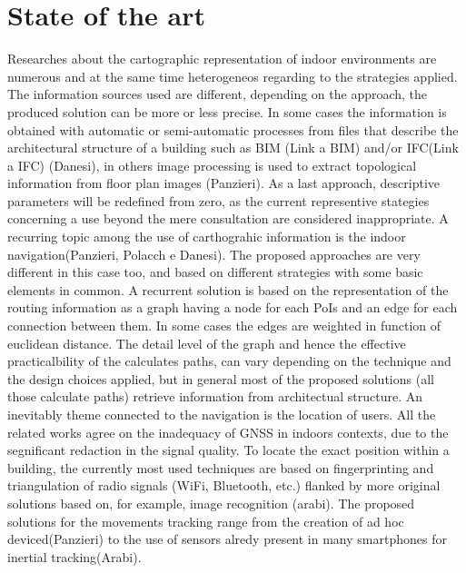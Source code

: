 \documentclass{sig-alternate}
\begin{document}
\section{State of the art}\label{state-of-the-art}

Researches about the cartographic representation of indoor environments
are numerous and at the same time heterogeneos regarding to the
strategies applied. The information sources used are different,
depending on the approach, the produced solution can be more or less
precise. In some cases the information is obtained with automatic or
semi-automatic processes from files that describe the architectural
structure of a building such as BIM (Link a BIM) and/or IFC(Link a IFC)
(Danesi), in others image processing is used to extract topological
information from floor plan images (Panzieri). As a last approach,
descriptive parameters will be redefined from zero, as the current
representive stategies concerning a use beyond the mere consultation are
considered inappropriate. A recurring topic among the use of
carthograhic information is the indoor navigation(Panzieri, Polacch e
Danesi). The proposed approaches are very different in this case too,
and based on different strategies with some basic elements in common. A
recurrent solution is based on the representation of the routing
information as a graph having a node for each PoIs and an edge for each
connection between them. In some cases the edges are weighted in
function of euclidean distance. The detail level of the graph and hence
the effective practicalbility of the calculates paths, can vary
depending on the technique and the design choices applied, but in
general most of the proposed solutions (all those calculate paths)
retrieve information from architectual structure. An inevitably theme
connected to the navigation is the location of users. All the related
works agree on the inadequacy of GNSS in indoors contexts, due to the
segnificant redaction in the signal quality. To locate the exact
position within a building, the currently most used techniques are based
on fingerprinting and triangulation of radio signals (WiFi, Bluetooth,
etc.) flanked by more original solutions based on, for example, image
recognition (arabi). The proposed solutions for the movements tracking
range from the creation of ad hoc deviced(Panzieri) to the use of
sensors alredy present in many smartphones for inertial tracking(Arabi).
\end{document}
